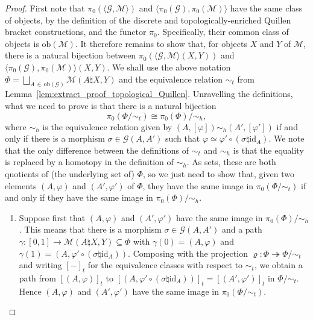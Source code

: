 \documentclass[AHL,Unicode,published]{cedram}
\newcommand{\obj}{\ensuremath{\mathrm{ob}}}
\newcommand{\id}{\mathrm{id}}
\newcommand{\cG}{\mathcal{G}}
\newcommand{\cM}{\mathcal{M}}
\newcommand{\too}{\ensuremath{\longrightarrow}}
\newcommand*{\alphenumi}{\renewcommand*{\theenumi}{\alph{enumi}}}
\begin{document}
\begin{proof}
First note that $\pi_{0}(\langle \cG,\cM \rangle)$ and $\langle \pi_{0}(\cG),\pi_{0}(\cM) \rangle$ have the same class of objects, by the definition of the discrete and topologically-enriched Quillen bracket constructions, and the functor $\pi_{0}$. Specifically, their common class of objects is $\obj(\cM)$. It therefore remains to show that, for objects $X$ and $Y$ of $\cM$, there is a natural bijection between $\pi_{0}(\langle \cG,\cM \rangle(X,Y))$ and $\langle \pi_{0}(\cG),\pi_{0}(\cM) \rangle(X,Y)$. We shall use the above notation $\Phi = \bigsqcup_{A\,\in\,\obj(\cG)} \cM(A\natural X,Y)$ and the equivalence relation $\sim_{t}$ from Lemma~\ref{lem:extract_proof_topological_Quillen}. Unravelling the definitions, what we need to prove is that there is a natural bijection
\[
\pi_{0}(\Phi/{\sim_{t}}) \cong \pi_{0}(\Phi)/{\sim_h},
\]
where $\sim_h$ is the equivalence relation given by $(A,[\varphi]) \sim_h (A',[\varphi'])$ if and only if there is a morphism $\sigma \in \cG(A,A')$ such that $\varphi \simeq \varphi' \circ (\sigma\natural\id_{A})$. We note that the only difference between the definitions of $\sim_t$ and $\sim_h$ is that the equality is replaced by a homotopy in the definition of $\sim_h$. As sets, these are both quotients of (the underlying set of) $\Phi$, so we just need to show that, given two elements $(A,\varphi)$ and $(A',\varphi')$ of $\Phi$, they have the same image in $\pi_{0}(\Phi/{\sim_{t}})$ if and only if they have the same image in $\pi_{0}(\Phi)/{\sim_h}$.
\begin{enumerate}\alphenumi
\item Suppose first that $(A,\varphi)$ and $(A',\varphi')$ have the same image in $\pi_{0}(\Phi)/{\sim_h}$. This means that there is a morphism $\sigma \in \cG(A,A')$ and a path $\gamma \colon [0,1] \too \cM(A\natural X,Y) \subseteq \Phi$ with $\gamma(0) = (A,\varphi)$ and $\gamma(1) = (A,\varphi' \circ (\sigma\natural\id_{A}))$. Composing with the projection $\varrho \colon \Phi \twoheadrightarrow \Phi/{\sim_{t}}$ and writing $[-]_t$ for the equivalence classes with respect to $\sim_{t}$, we obtain a path from $[(A,\varphi)]_t$ to $[(A,\varphi' \circ (\sigma\natural\id_{A}))]_t = [(A',\varphi')]_t$ in $\Phi/{\sim_{t}}$. Hence $(A,\varphi)$ and $(A',\varphi')$ have the same image in $\pi_{0}(\Phi/{\sim_{t}})$.


\end{enumerate}
\end{proof}
\end{document}
